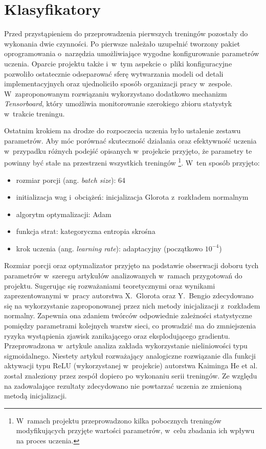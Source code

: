 \section{Klasyfikatory}

Przed przystąpieniem do przeprowadzenia pierwszych treningów pozostały do wykonania dwie czynności. Po pierwsze należało uzupełnić tworzony pakiet oprogramowania o~narzędzia umożliwiające wygodne konfigurowanie parametrów uczenia. Oparcie projektu także i~w~tym aspekcie o~pliki konfiguracyjne pozwoliło ostatecznie odseparować sferę wytwarzania modeli od detali implementacyjnych oraz ujednoliciło sposób organizacji pracy w~zespole. W~zaproponowanym rozwiązaniu wykorzystano dodatkowo mechanizm \textit{Tensorboard}, który umożliwia monitorowanie szerokiego zbioru statystyk w~trakcie treningu.

Ostatnim krokiem na drodze do rozpoczecia uczenia było ustalenie zestawu parametrów. Aby móc porównać skuteczność działania oraz efektywność uczenia w~przypadku różnych podejść opisanych w~projekcie przyjęto, że parametry te powinny być stałe na przestrzeni wszystkich treningów \footnote{W~ramach projektu przeprowadzono kilka pobocznych treningów modyfikujących przyjęte wartości parametrów, w~celu zbadania ich wpływu na proces uczenia.}. W~ten sposób przyjęto:

\begin{itemize}
    \item rozmiar porcji (ang. \textit{batch size}): 64
    \item initializacja wag i~obciążeń: inicjalizacja Glorota z~rozkładem normalnym
    \item algorytm optymalizacji: Adam
    \item funkcja strat: kategoryczna entropia skrośna
    \item krok uczenia (ang. \textit{learning rate}): adaptacyjny (początkowo $10^{-4}$)
\end{itemize}

Rozmiar porcji oraz optymalizator przyjęto na podstawie obserwacji doboru tych parametrów w~szeregu artykułów analizowanych w~ramach przygotowań do projektu. Sugerując się rozważaniami teoretycznymi oraz wynikami zaprezentowanymi w~pracy autorstwa X.~Glorota oraz Y.~Bengio \cite{glorot} zdecydowano się na wykorzystanie zaproponowanej przez nich metody inicjalizacji z~rozkładem normalny. Zapewnia ona zdaniem twórców odpowiednie zależności statystyczne pomiędzy parametrami kolejnych warstw sieci, co prowadzić ma do zmniejszenia ryzyka wystąpienia zjawisk zanikającego oraz eksplodującego gradientu. Przeprowadzona w~artykule analiza zakłada wykorzystanie nieliniowości typu sigmoidalnego. Niestety artykuł rozważający analogiczne rozwiązanie dla funkcji aktywacji typu ReLU (wykorzystanej w~projekcie) autorstwa Kaiminga He et al. \cite{he} został znaleziony przez zespół dopiero po wykonaniu serii treningów. Ze względu na zadowalające rezultaty zdecydowano nie powtarzać uczenia ze zmienioną metodą inicjalizacji.

